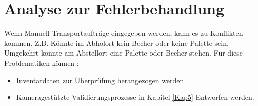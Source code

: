 \chapter{Analyse zur Fehlerbehandlung}\label{Fehlerbehandlung}


Wenn Manuell Transportaufträge eingegeben werden, kann es zu Konflikten kommen.
Z.B. Könnte im Abholort kein Becher oder keine Palette sein.
Umgekehrt könnte am Abstellort eine Palette oder Becher stehen.
Für diese Problematiken können :
\begin{itemize}
    \item Inventardaten zur Überprüfung herangezogen werden
    \item Kameragestützte Validierungsprozesse in Kapitel \ref{Kap5} Entworfen werden.
\end{itemize}